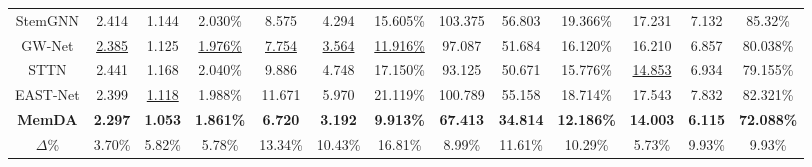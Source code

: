 \documentclass[sigconf]{acmart}
\begin{document}
\begin{table*}[h]
{\begin{tabular*}{15.2cm}{@{\extracolsep{\fill}}c||ccc|ccc|ccc|ccc}
        StemGNN & 2.414 & 1.144 & 2.030\% & 8.575 & 4.294 & 15.605\% & 103.375 & 56.803 & 19.366\% & 17.231 & 7.132 & 85.32\% \\
        GW-Net & \underline{2.385} & 1.125 & \underline{1.976\%} & \underline{7.754} & \underline{3.564} & \underline{11.916\%} & 97.087 & 51.684 & 16.120\% & 16.210 & 6.857 & 80.038\% \\
        STTN & 2.441 & 1.168 & 2.040\% & 9.886 & 4.748 & 17.150\% & 93.125 & 50.671 & 15.776\% & \underline{14.853} & 6.934 & 79.155\% \\
        EAST-Net & 2.399 & \underline{1.118} & 1.988\% & 11.671 & 5.970 & 21.119\% & 100.789 & 55.158 & 18.714\% & 17.543 & 7.832 & 82.321\% \\
        \hline
        \textbf{MemDA} & \textbf{2.297} & \textbf{1.053} & \textbf{1.861\%} & \textbf{6.720} & \textbf{3.192} & \textbf{9.913\%} & \textbf{67.413} & \textbf{34.814} & \textbf{12.186\%} & \textbf{14.003} & \textbf{6.115} & \textbf{72.088\%} \\
        $\Delta$\% & 3.70\% & 5.82\% & 5.78\% & 13.34\% & 10.43\% & 16.81\% & 8.99\% & 11.61\% & 10.29\% & 5.73\% & 9.93\% & 9.93\% \\
		\hline
	\end{tabular*}}
\end{table*}
\end{document}
